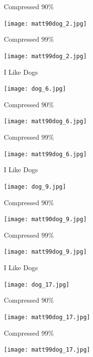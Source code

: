 \documentclass{beamer}
\begin{document}
\begin{frame}{Compressed $90\%$}
\begin{center}
\texttt{[image: matt90dog\_2.jpg]}
\end{center}
\end{frame}

\begin{frame}{Compressed $99\%$}
\begin{center}
\texttt{[image: matt99dog\_2.jpg]}
\end{center}
\end{frame}

\begin{frame}{I Like Dogs}
\begin{center}
\texttt{[image: dog\_6.jpg]}
\end{center}
\end{frame}

\begin{frame}{Compressed $90\%$}
\begin{center}
\texttt{[image: matt90dog\_6.jpg]}
\end{center}
\end{frame}

\begin{frame}{Compressed $99\%$}
\begin{center}
\texttt{[image: matt99dog\_6.jpg]}
\end{center}
\end{frame}

\begin{frame}{I Like Dogs}
\begin{center}
\texttt{[image: dog\_9.jpg]}
\end{center}
\end{frame}

\begin{frame}{Compressed $90\%$}
\begin{center}
\texttt{[image: matt90dog\_9.jpg]}
\end{center}
\end{frame}

\begin{frame}{Compressed $99\%$}
\begin{center}
\texttt{[image: matt99dog\_9.jpg]}
\end{center}
\end{frame}

\begin{frame}{I Like Dogs}
\begin{center}
\texttt{[image: dog\_17.jpg]}
\end{center}
\end{frame}

\begin{frame}{Compressed $90\%$}
\begin{center}
\texttt{[image: matt90dog\_17.jpg]}
\end{center}
\end{frame}

\begin{frame}{Compressed $99\%$}
\begin{center}
\texttt{[image: matt99dog\_17.jpg]}
\end{center}
\end{frame}
\end{document}
